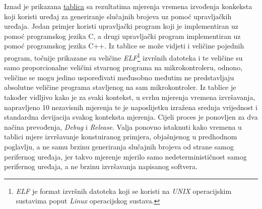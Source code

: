 Iznad je prikazana \hyperref[table:results]{tablica} sa rezultatima mjerenja vremena izvođenja konkeksta koji koristi uređaj za generiranje slučajnih brojeva uz pomoć upravljačkih uređaja. Jedan primjer koristi upravljački program koji je implementiran uz pomoć programskog jezika C, a drugi upravljački program implementiran uz pomoć programskog jezika C++. Iz tablice se može vidjeti i veličine pojednih program, točnije prikazane su veličine \textit{ELF}\footnote{\textit{ELF} je format izvršnih datoteka koji se koristi na \textit{UNIX} operacijskim sustavima poput \textit{Linux} operacijskog sustava.} izvršnih datoteka i te veličine su samo proporcionalne veličini stvarnog programa na mikrokontroleru, odnono, veličine se mogu jedino uspoređivati međusobno međutim ne predstavljaju absolutne veličine programa stavljenog na sam mikrokontroler. Iz tablice je također vidljivo kako je za svaki kontekst, u svrhu mjerenja vremena izvršavanja, napravljeno 10 nezavisnih mjerenja te je naposlijetku izražena srednja vrijednost i standardna devijacija svakog konteksta mjerenja. Cijeli proces je ponovljen za dva načina prevođenja, \textit{Debug} i \textit{Release}. Valja ponovno istaknuti kako vremena u tablici mjere izvršavanje konstuiranog primjera, objašnjenog u predhodnom poglavlju, a ne samu brzinu generiranja slučajnih brojeva od strane samog perifernog uređaja, jer takvo mjerenje mjerilo samo nedeterminističnost samog perifernog uređaja, a ne brzinu izvršavanja napisanog softvera.

    